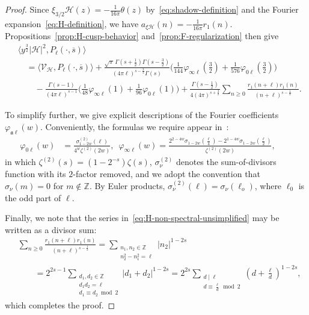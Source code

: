 \documentclass[11pt,reqno]{amsart}
\theoremstyle{plain}
\theoremstyle{definition}
\numberwithin{equation}{section}
\begin{document}
\begin{proof}
Since $\xi_{3/2} \mathcal{H}(z) = - \frac{1}{16\pi} \theta(z)$ by~\eqref{eq:shadow-definition} and the Fourier expansion~\eqref{eq:H-definition}, we have $a_{\xi \mathcal{H}}(n) = - \frac{1}{16\pi} r_1(n)$. Propositions~\ref{prop:H-cusp-behavior} and~\ref{prop:F-regularization} then give
\begin{align} \label{eq:H-non-spectral-unsimplified}
	& \langle y^{\frac{3}{2}} \vert \mathcal{H} \vert^2, P_\ell(\cdot, \overline{s}) \rangle  \\
	&\quad = \langle \mathcal{V}_\mathcal{H}, P_\ell(\cdot, \overline{s}) \rangle  
	+ 
			\frac{\sqrt{\pi}\, \Gamma(s+\frac{1}{2})\Gamma(s-\frac{3}{2})}
					{(4 \pi \ell)^{s-\frac{3}{2}} \Gamma(s)}
				\Big( \tfrac{1}{144} \varphi_{\infty \ell}(\tfrac{3}{2}) 
					+ \tfrac{1}{576} \varphi_{0 \ell}(\tfrac{3}{2}) \Big) \\
	& \qquad -
	 \frac{\Gamma(s-1)}{(4\pi \ell)^{s-1}}
				\Big(\tfrac{1}{48} \varphi_{\infty \ell}(1) 
					+ \tfrac{1}{96} \varphi_{0 \ell}(1) \Big) 
		+
	\frac{\Gamma(s-\frac{1}{2})}{4(4\pi)^{s+\frac{3}{2}}}
		\sum_{n \geq 0}	\frac{r_1(n+\ell)r_1(n)}{(n+\ell)^{s-\frac{1}{2}}}.
\end{align}

To simplify further, we give explicit descriptions of the Fourier coefficients $\varphi_{\mathfrak{a}\ell}(w)$. Conveniently, the formulas we require appear in~\cite[\S{3.3}]{HKLDWSphere}:
\begin{align}
 \label{eq:phi-formulas}
	\varphi_{0 \ell}(w) &= \frac{\sigma_{1-2w}^{(2)}(\ell)}{4^w \zeta^{(2)}(2w)},
	\,\,\,
	\varphi_{\infty \ell}(w) 
		= \frac{2^{2-4w} \sigma_{1-2w}(\frac{\ell}{4}) - 2^{1-4w} \sigma_{1-2w}(\frac{\ell}{2})}
				{\zeta^{(2)}(2w)},
				\qquad
\end{align}
in which $\zeta^{(2)}(s) = (1-2^{-s})\zeta(s)$, $\sigma_\nu^{(2)}$ denotes the sum-of-divisors function with its $2$-factor removed, and we adopt the convention that $\sigma_\nu(m) = 0$ for $m \notin \mathbb{Z}$. By Euler products, $\sigma_\nu^{(2)}(\ell) = \sigma_\nu(\ell_o)$, where $\ell_0$ is the odd part of $\ell$.

Finally, we note that the series in~\eqref{eq:H-non-spectral-unsimplified} may be written as a divisor sum:
\begin{align*}
	& \sum_{n \geq 0}	\frac{r_1(n+\ell)r_1(n)}{(n+\ell)^{s-\frac{1}{2}}}
		= \sum_{\substack{n_1,n_2 \in \mathbb{Z} \\ n_2^2 - n_1^2 = \ell}} \vert n_2 \vert^{1-2s} \\
	&	\qquad 
	= 2^{2s-1} \!\!\! \sum_{\substack{d_1,d_2 \in \mathbb{Z} \\ d_1 d_2 = \ell \\ d_1 \equiv d_2 \bmod 2}} \!\!\!
		\vert d_1 + d_2 \vert^{1-2s}
	= 2^{2s} \!\!\! \sum_{\substack{d \mid \ell \\ d \equiv \frac{\ell}{d} \bmod 2}} \!\!\!
			(d+\tfrac{\ell}{d})^{1-2s},
\end{align*}
which completes the proof.
\end{proof}
\end{document}
